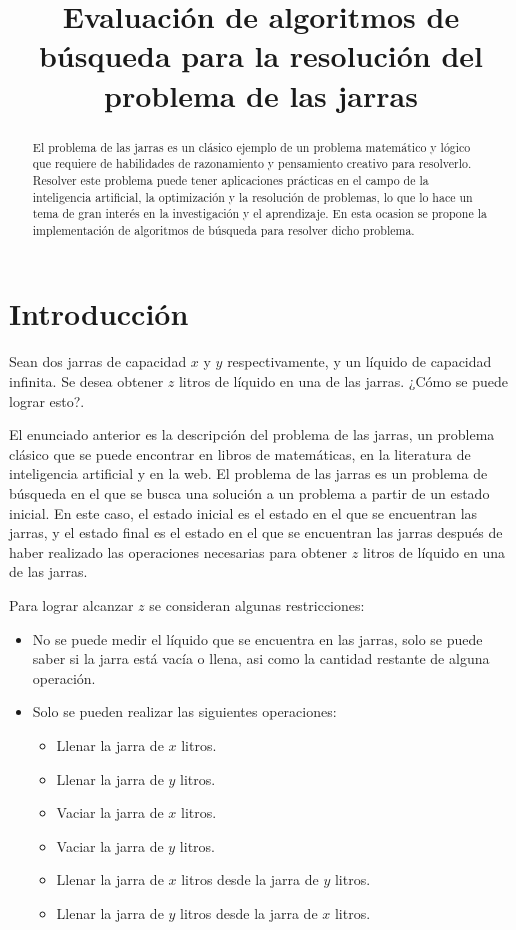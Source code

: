 \documentclass[journal]{IEEEtran}
\begin{document}
\title{Evaluación de algoritmos de búsqueda para la resolución del problema de las jarras}

\author{}

\maketitle

\begin{abstract}
  El problema de las jarras es un clásico ejemplo de un problema matemático y lógico que requiere de habilidades de razonamiento y pensamiento creativo para resolverlo. Resolver este problema puede tener aplicaciones prácticas en el campo de la inteligencia artificial, la optimización y la resolución de problemas, lo que lo hace un tema de gran interés en la investigación y el aprendizaje. En esta ocasion se propone la implementación de algoritmos de búsqueda para resolver dicho problema.
\end{abstract}

\section{Introducción}
Sean dos jarras de capacidad $x$ y $y$ respectivamente, y un líquido de capacidad infinita. Se desea obtener $z$ litros de líquido en una de las jarras. ¿Cómo se puede lograr esto?.

El enunciado anterior es la descripción del problema de las jarras, un problema clásico que se puede encontrar en libros de matemáticas, en la literatura de inteligencia artificial y en la web. El problema de las jarras es un problema de búsqueda en el que se busca una solución a un problema a partir de un estado inicial. En este caso, el estado inicial es el estado en el que se encuentran las jarras, y el estado final es el estado en el que se encuentran las jarras después de haber realizado las operaciones necesarias para obtener $z$ litros de líquido en una de las jarras.

Para lograr alcanzar $z$ se consideran algunas restricciones:
\begin{itemize}
  \item No se puede medir el líquido que se encuentra en las jarras, solo se puede saber si la jarra está vacía o llena, asi como la cantidad restante de alguna operación.
  \item Solo se pueden realizar las siguientes operaciones:
        \begin{itemize}
          \item Llenar la jarra de $x$ litros.
          \item Llenar la jarra de $y$ litros.
          \item Vaciar la jarra de $x$ litros.
          \item Vaciar la jarra de $y$ litros.
          \item Llenar la jarra de $x$ litros desde la jarra de $y$ litros.
          \item Llenar la jarra de $y$ litros desde la jarra de $x$ litros.
        \end{itemize}
\end{itemize}
\end{document}
